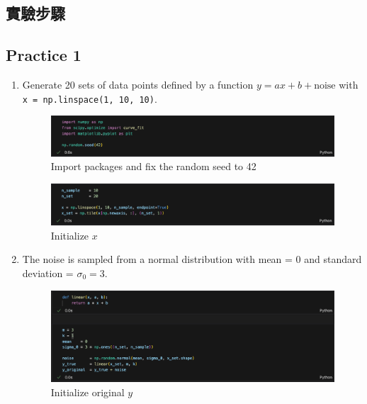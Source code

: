 \documentclass[12pt,a4paper]{article}
\begin{document}
\begin{CJK}{UTF8}{bkai}
\clearpage
\section{實驗步驟}

\subsection{Practice 1}
\hfill

\begin{enumerate}
    \item Generate 20 sets of data points defined by a function \( y = ax + b + \text{noise} \) with \texttt{x = np.linspace(1, 10, 10)}.
    \begin{figure}[h]
        \centering
        \includegraphics[width=1\linewidth]{figures/code/code_1_1.png}
        \caption{Import packages and fix the random seed to 42}
        \label{fig:code_1_1}
    \end{figure}
    \begin{figure}[h]
        \centering
        \includegraphics[width=1\linewidth]{figures/code/code_1_2.png}
        \caption{Initialize $x$}
        \label{fig:code_1_2}
    \end{figure}
    \item The noise is sampled from a normal distribution with mean = 0 and standard deviation = $\sigma_0 = 3$.
    \begin{figure}[h]
        \centering
        \includegraphics[width=1\linewidth]{figures/code/code_1_3.png}
        \caption{Initialize original $y$}
        \label{fig:code_1_3}
    \end{figure}

\end{enumerate}
\end{CJK}
\end{document}
